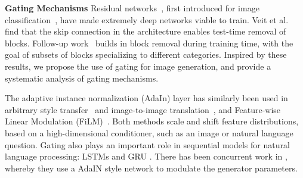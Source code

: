 


\vspace{2mm} \noindent \textbf{Gating Mechanisms}
Residual networks~\cite{he2016deep}, first introduced for image classification~\cite{krizhevsky2012imagenet}, have made extremely deep networks viable to train. Veit et al.~\cite{veit2016residual} find that the skip connection in the architecture enables test-time removal of blocks. Follow-up work~\cite{veit2018adaptive} builds in block removal during training time, with the goal of subsets of blocks specializing to different categories. Inspired by these results, we propose the use of gating for image generation, and provide a systematic analysis of gating mechanisms.

The adaptive instance normalization (AdaIn) layer has similarly been used in arbitrary style transfer~\cite{huang2017arbitrary} and image-to-image translation~\cite{huang2018multimodal}, and Feature-wise Linear Modulation (FiLM)~\cite{perez2017film}. Both methods scale and shift feature distributions, based on a high-dimensional conditioner, such as an image or natural language question. Gating also plays an important role in sequential models for natural language processing: LSTMs \cite{hochreiter1997long} and GRU \cite{cho2014learning}. There has been concurrent work in \cite{karras2018style}, \cite{park2019semantic} whereby they use a AdaIN style network to modulate the generator parameters.

